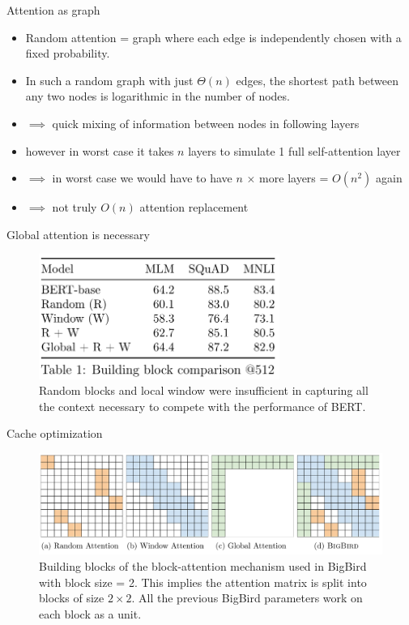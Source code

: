 \documentclass{beamer}
\begin{document}
\begin{frame}{Attention as graph}

\begin{itemize}
\item Random attention = graph where each edge is independently chosen with a fixed probability.

\item In such a random graph with just $\Theta(n)$ edges, the shortest path between any two nodes is logarithmic in the number of nodes.

\item $\implies$ quick mixing of information between nodes in following layers

\item however in worst case it takes $n$ layers to simulate 1 full self-attention layer

\item $\implies$ in worst case we would have to have $n$ $\times$ more layers = $O(n^2)$ again

\item $\implies$ not truly $O(n)$ attention replacement
\end{itemize}


\end{frame}
\begin{frame}{Global attention is necessary}
\begin{figure}[h]
\includegraphics[width=0.7\textwidth]{img/blocks}
\caption{Random blocks and local window were insufficient in capturing all the context necessary to compete with the performance of BERT.}
\end{figure}
\end{frame}
\begin{frame}{Cache optimization}
\begin{figure}[h]
\includegraphics[width=\textwidth]{img/cache}
\caption{Building blocks of the block-attention mechanism used in BigBird with block size = 2. This implies the attention matrix is split into blocks of size $2 \times 2$. All the previous BigBird parameters work on each block as a unit.}
\end{figure}
\end{frame}
\end{document}
